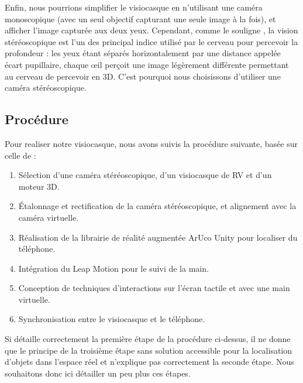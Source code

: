 Enfin, nous pourrions simplifier le visiocasque en n'utilisant une caméra monoscopique (avec un seul objectif capturant une seule image à la fois), et afficher l'image capturée aux deux yeux. Cependant, comme le souligne \cite{Bourke1999}, la vision stéréoscopique est l'un des principal indice utilisé par le cerveau pour percevoir la profondeur : les yeux étant séparés horizontalement par une distance appelée écart pupillaire, chaque \oe il perçoit une image légèrement différente  permettant au cerveau de percevoir en 3D. C'est pourquoi nous choisissons d'utiliser une caméra stéréoscopique.


\subsection{Procédure}
Pour realiser notre visiocasque, nous avons suivis la procédure suivante, basée sur celle de \cite{Steptoe2013} :
\begin{enumerate}
  \item Sélection d'une caméra stéréoscopique, d'un visiocasque de RV et d'un moteur 3D.  
  \item Étalonnage et rectification de la caméra stéréoscopique, et alignement avec la caméra virtuelle.
  \item Réalisation de la librairie de réalité augmentée ArUco Unity pour localiser du téléphone.
  \item Intégration du Leap Motion pour le suivi de la main.
  \item Conception de techniques d'interactions sur l'écran tactile et avec une main virtuelle.
  \item Synchronisation entre le visiocasque et le téléphone.
\end{enumerate}

Si \cite{Steptoe2013} détaille correctement la première étape de la procédure ci-dessus, il ne donne que le principe de la troisième étape sans solution accessible pour la localisation d'objets dans l'espace réel et n'explique pas correctement la seconde étape. Nous souhaitons donc ici détailler un peu plus ces étapes.

